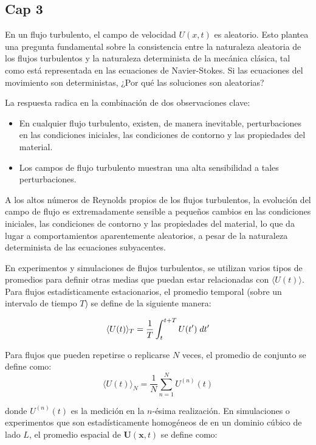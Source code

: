 \subsection{Cap 3}

En un flujo turbulento, el campo de velocidad $U(x,t)$ es aleatorio. Esto plantea una pregunta fundamental sobre la consistencia entre la naturaleza aleatoria de los flujos turbulentos y la naturaleza determinista de la mecánica clásica, tal como está representada en las ecuaciones de Navier-Stokes. Si las ecuaciones del movimiento son deterministas, ¿Por qué las soluciones son aleatorias?

La respuesta radica en la combinación de dos observaciones clave:

\begin{itemize}
	\item En cualquier flujo turbulento, existen, de manera inevitable, perturbaciones en las condiciones iniciales, las condiciones de contorno y las propiedades del material.
	\item Los campos de flujo turbulento muestran una alta sensibilidad a tales perturbaciones.
\end{itemize}
    
A los altos números de Reynolds propios de los flujos turbulentos, la evolución del campo de flujo es extremadamente sensible a pequeños cambios en las condiciones iniciales, las condiciones de contorno y las propiedades del material, lo que da lugar a comportamientos aparentemente aleatorios, a pesar de la naturaleza determinista de las ecuaciones subyacentes.


En experimentos y simulaciones de flujos turbulentos, se utilizan varios tipos de promedios para definir otras medias que puedan estar relacionadas con $ \langle U(t) \rangle$. Para flujos estadísticamente estacionarios, el promedio temporal (sobre un intervalo de tiempo $T$) se define de la siguiente manera:

$$\langle U(t) \rangle_T = \frac{1}{T} \int_t^{t+T} U(t') \hspace*{1mm} dt'$$

Para flujos que pueden repetirse o replicarse \( N \) veces, el promedio de conjunto se define como:
$$\langle U(t) \rangle_N = \frac{1}{N} \sum_{n=1}^{N} U^{(n)}(t)$$

donde  $U^{(n)}(t)$ es la medición en la  $n$-ésima realización. En simulaciones o experimentos que son estadísticamente homogéneos de en un dominio cúbico de lado $L$, el promedio espacial de $\mathbf{U}(\mathbf{x},t)$ se define como:


